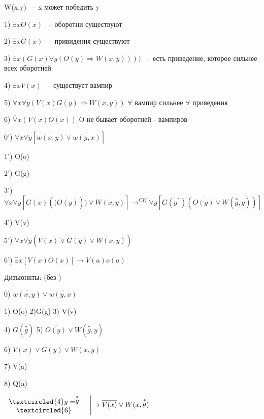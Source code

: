 \documentclass[russian]{lecture-notes}
\begin{document}
        \begin{example}

            W(x,y) ~-- x может победить y

            1) $\exists x O(x)$ ~-- оборотни существуют

            2) $\exists x G(x)$ ~-- привидения существуют

            3) $\exists x (G(x) \forall y (O(y) \Rightarrow W(x,y) )))$ ~-- есть приведение, которое сильнее всех оборотней

            4) $\exists x V(x)$ ~-- существует вампир

            5) $\forall x \forall y (V(x)G(y) \Rightarrow W(x,y) )$ \quad $\forall $ вампир сильнее $\forall $ приведения

            6) $\overline \forall x (V(x) O(x)) $ O не бывает оборотней - вампиров

            0') $\forall x \forall y [\overline{w(x,y)} \lor \overline{w(y,x)}]$

            1') O(o)

            2') G(g)

            3') $\forall x \forall y [G(x)(\overline{(O(y)})) \lor W(x,y)] \rightarrow^{CK} \forall y [ G(g^{\^}) (\overline{O(y)} \lor W(\stackrel{ * }{g},g )) ] $

            4') V(v)

            5') $\forall x \forall y (\overline{V(x)} \lor \overline{G(y)} \lor W(x,y)) $

            6') $\exists x [V(x) O(x)] \rightarrow V(a) o(a) $

            Дизъюнкты: (без \forall)

            0) $\overline{w(x,y) } \lor \overline{w(y,x)} $

            1) O(o) 2)G(g) 3) V(v)

            4) $G(\stackrel{ * }{g})$ 5) $\overline{O(y)} \lor W(\stackrel{ * }{g},y) $

            6) $\overline{V(x)} \lor \overline{G(y)} \lor W(x,y)$

            7) V(a)

            8) Q(a)



             $
        \left.
        \begin{array}{cc}
            \textcircled{4} y = \stackrel{ * }{g} & \\
            \textcircled{6} &            \\
        \end{array}
        \right. \vline \rightarrow \overline{V(x)} \lor W(x,\stackrel{ * }{g})
        $


\end{example}
\end{document}

